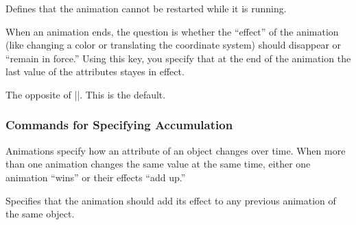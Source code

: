 \begin{command}{\pgfsys@animation@restart@whennotactive}
  Defines that the animation cannot be restarted while it is running.
\begin{codeexample}[width=2cm]
\end{codeexample}
\end{command}

\begin{command}{\pgfsys@animation@freezeatend{}}
  When an animation ends, the question is whether the ``effect'' of
  the animation (like changing a color or translating the coordinate
  system) should disappear or ``remain in force.'' Using this key, you
  specify that at the end of the animation the last value of the
  attributes stayes in effect.
\begin{codeexample}[width=2cm]
\end{codeexample}
\end{command}

\begin{command}{\pgfsys@animation@removeatend{}}
  The opposite of |\pgfsys@animation@freezeatend|. This is the default.
\begin{codeexample}[width=2cm]
\end{codeexample}
\end{command}


\subsubsection{Commands for Specifying Accumulation}
\label{section-value-types}


Animations specify how an attribute of an object changes over
time. When more than one animation changes the same value at the same
time, either one animation ``wins'' or their effects ``add up.''

\begin{command}{\pgfsys@animation@sum{}}
  Specifies that the animation should add its effect to any previous
  animation of the same object.
\begin{codeexample}[width=2cm]
\end{codeexample}
\end{command}

